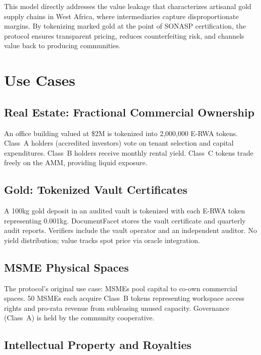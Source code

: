 \documentclass[11pt,a4paper]{article}
\begin{document}
This model directly addresses the value leakage that characterizes artisanal gold supply chains in West Africa, where intermediaries capture disproportionate margins. By tokenizing marked gold at the point of SONASP certification, the protocol ensures transparent pricing, reduces counterfeiting risk, and channels value back to producing communities.

\section{Use Cases}
\label{sec:usecases}

\subsection{Real Estate: Fractional Commercial Ownership}

An office building valued at \$2M is tokenized into 2,000,000 E-RWA tokens. Class~A holders (accredited investors) vote on tenant selection and capital expenditures. Class~B holders receive monthly rental yield. Class~C tokens trade freely on the AMM, providing liquid exposure.

\subsection{Gold: Tokenized Vault Certificates}

A 100kg gold deposit in an audited vault is tokenized with each E-RWA token representing 0.001kg. DocumentFacet stores the vault certificate and quarterly audit reports. Verifiers include the vault operator and an independent auditor. No yield distribution; value tracks spot price via oracle integration.

\subsection{MSME Physical Spaces}

The protocol's original use case: MSMEs pool capital to co-own commercial spaces. 50 MSMEs each acquire Class~B tokens representing workspace access rights and pro-rata revenue from subleasing unused capacity. Governance (Class~A) is held by the community cooperative.

\subsection{Intellectual Property and Royalties}
\end{document}
